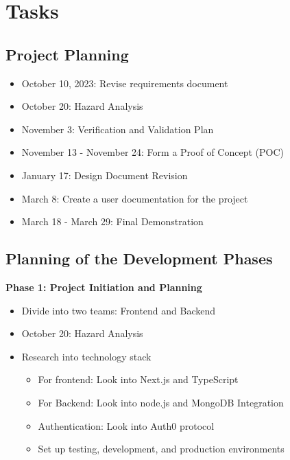 \documentclass[12pt]{article}
\begin{document}
\section{Tasks}
\subsection{Project Planning}
\begin{itemize}
    \item October 10, 2023: Revise requirements document
    \item October 20: Hazard Analysis
    \item November 3: Verification and Validation Plan
    \item November 13 - November 24: Form a Proof of Concept (POC)
    \item January 17: Design Document Revision
    \item March 8: Create a user documentation for the project
    \item March 18 - March 29: Final Demonstration 
\end{itemize}

\subsection{Planning of the Development Phases}

\textbf{Phase 1: Project Initiation and Planning}
\begin{itemize}
    \item Divide into two teams: Frontend and Backend

    \item October 20: Hazard Analysis
    \item Research into technology stack
        \begin{itemize}
            \item For frontend: Look into Next.js and TypeScript
            \item For Backend: Look into node.js and MongoDB Integration
            \item Authentication: Look into Auth0 protocol
            \item Set up testing, development, and production environments
        \end{itemize}
\end{itemize}
\end{document}
